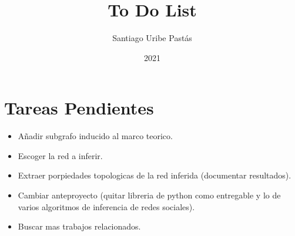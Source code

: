 \documentclass{article}
\title{To Do List}
\author{Santiago Uribe Pastás}
\date{2021}
\begin{document}
\maketitle

\section{Tareas Pendientes}
\begin{itemize}
    \item Añadir subgrafo inducido al marco teorico.
    \item Escoger la red a inferir.
    \item Extraer porpiedades topologicas de la red inferida (documentar resultados).
    \item Cambiar anteproyecto (quitar libreria de python como entregable y lo de varios algoritmos de inferencia de redes sociales).
    \item Buscar mas trabajos relacionados.
\end{itemize}
\end{document}
